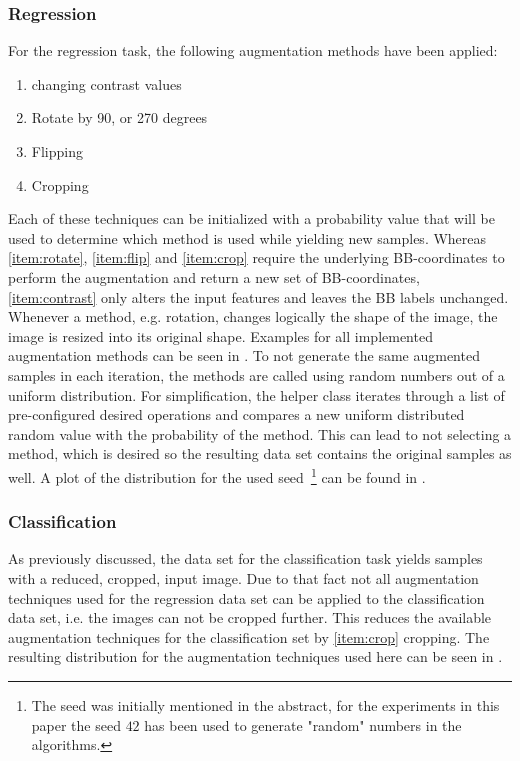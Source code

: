 \subsubsection{Regression}\label{subsubsec:regression-augmentation}
For the regression task, the following augmentation methods have been applied:
\begin{multicols}{2}
\begin{enumerate}
    \item\label{item:contrast} changing contrast values
    \item\label{item:rotate} Rotate by 90, or 270 degrees
    \item\label{item:flip} Flipping
    \item\label{item:crop} Cropping
\end{enumerate}
\end{multicols}
Each of these techniques can be initialized with a probability value that will be used to determine which method is used while yielding new samples.
Whereas \ref{item:rotate}, \ref{item:flip} and \ref{item:crop} require the underlying BB-coordinates to perform the augmentation and return a new set of BB-coordinates, \ref{item:contrast} only alters the input features and leaves the BB labels unchanged.
Whenever a method, e.g. rotation, changes logically the shape of the image, the image is resized into its original shape.
Examples for all implemented augmentation methods can be seen in .
To not generate the same augmented samples in each iteration, the methods are called using random numbers out of a uniform distribution.
For simplification, the helper class iterates through a list of pre-configured desired operations and compares a new uniform distributed random value with the probability of the method.
This can lead to not selecting a method, which is desired so the resulting data set contains the original samples as well.
A plot of the distribution for the used seed~\footnote{
    The seed was initially mentioned in the abstract, for the experiments in this paper the seed $42$ has been used to generate "random" numbers in the algorithms.
} can be found in .
\subsubsection{Classification}\label{subsubsec:classification-augmentation}
As previously discussed, the data set for the classification task yields samples with a reduced, cropped, input image.
Due to that fact not all augmentation techniques used for the regression data set can be applied to the classification data set, i.e. the images can not be cropped further.
This reduces the available augmentation techniques for the classification set by \ref{item:crop} cropping.
The resulting distribution for the augmentation techniques used here can be seen in .

